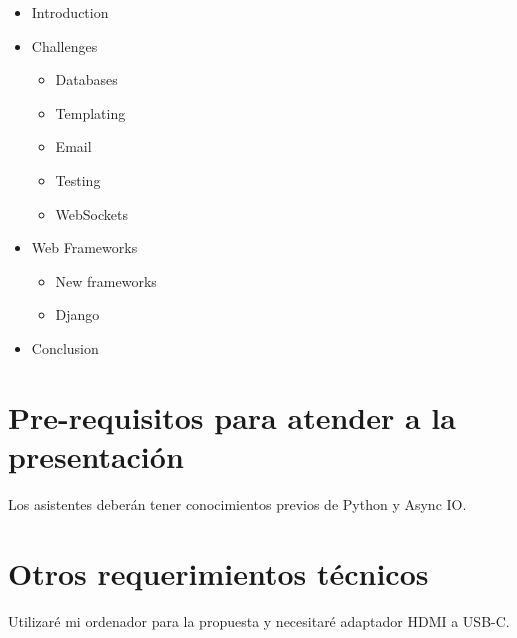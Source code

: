 \documentclass[runningheads]{llncs}
\begin{document}
\begin{itemize}
  \item Introduction \cite{AsyncIO}
  \item Challenges
  \begin{itemize}
    \item Databases
    \item Templating
    \item Email
    \item Testing
    \item WebSockets
  \end{itemize}
  \item Web Frameworks
  \begin{itemize}
    \item New frameworks
    \item Django \cite{Django}
  \end{itemize}
  \item Conclusion
\end{itemize}



\section{Pre-requisitos para atender a la presentación}
Los asistentes deber\'an tener conocimientos previos de Python y Async IO.

\section{Otros requerimientos t\'ecnicos}

Utilizar\'e mi ordenador para la propuesta y necesitar\'e adaptador HDMI a USB-C.


\clearpage



\end{document}
